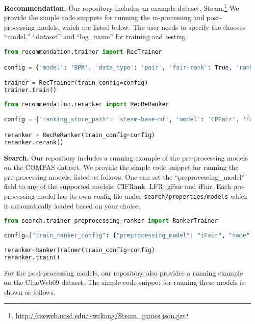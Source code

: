 \noindent\textbf{Recommendation.}
Our repository includes an example dataset, Steam.\footnote{\url{http://cseweb.ucsd.edu/~wckang/Steam_games.json.gz}} We provide the simple code snippets for running the in-processing and post-processing models, which are listed below. The user needs to specify the chooses ``model,'' ``dataset'' and ``log\_name'' for training and testing. 

\begin{lstlisting}[language=Python]
from recommendation.trainer import RecTrainer

config = {'model': 'BPR', 'data_type': 'pair', 'fair-rank': True, 'rank_model': 'APR', 'use_llm': False, 'log_name': "test", 'dataset': 'steam'}

trainer = RecTrainer(train_config=config)
trainer.train()
\end{lstlisting}

\begin{lstlisting}[language=Python]
from recommendation.reranker import RecReRanker

config = {'ranking_store_path': 'steam-base-mf', 'model': 'CPFair', 'fair-rank': True, 'log_name': 'test', 'fairness_metrics': ["GINI"], 'dataset': 'steam'}

reranker = RecReRanker(train_config=config)
reranker.rerank()
\end{lstlisting}

\noindent\textbf{Search.}
Our repository includes a running example of the pre-processing models on the COMPAS dataset. We provide the simple code snippet for running the pre-processing models, listed as follows. One can set the ``preprocessing\_model'' field to any of the supported models: CIFRank, LFR, gFair and iFair. Each pre-processing model has its own config file under \texttt{search/properties/models}  which is automatically loaded based on your choice. 

\begin{lstlisting}[language=Python]
from search.trainer_preprocessing_ranker import RankerTrainer
 
config={"train_ranker_config": {"preprocessing_model": "iFair", "name": "Ranklib", "ranker": "RankNet", "lr": 0.0001, "epochs": 10}}
 
reranker=RankerTrainer(train_config=config)
reranker.train()
\end{lstlisting}

For the post-processing models, our repository also provides a running example on the ClueWeb09 dataset. The simple code snippet for running these models is shown as follows. %

